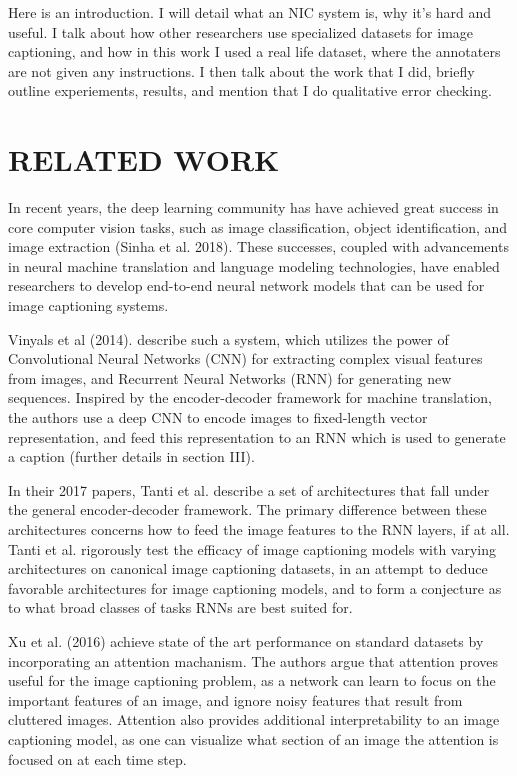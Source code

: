 \documentclass[letterpaper, 10 pt, conference]{ieeeconf}
\begin{document}
Here is an introduction. I will detail what an NIC system is, why it's hard and useful. I talk about how other researchers use specialized datasets for image captioning, and how in this work I used a real life dataset, where the annotaters are not given any instructions. I then talk about the work that I did, briefly outline experiements, results, and mention that I do qualitative error checking. 

\section{RELATED WORK}

In recent years, the deep learning community has have achieved great success in core computer vision tasks, such as image classification, object identification, and image extraction (Sinha et al. 2018). These successes, coupled with advancements in neural machine translation and language modeling technologies, have enabled researchers to develop end-to-end neural network models that can be used for image captioning systems. 

Vinyals et al (2014). describe such a system, which utilizes the power of Convolutional Neural Networks (CNN) for extracting complex visual features from images, and Recurrent Neural Networks (RNN) for generating new sequences. Inspired by the encoder-decoder framework for machine translation, the authors use a deep CNN to encode images to fixed-length vector representation, and feed this representation to an RNN which is used to generate a caption (further details in section III). 


In their 2017 papers, Tanti et al. describe a set of architectures that fall under the general encoder-decoder framework. The primary difference between these architectures concerns how to feed the image features to the RNN layers, if at all. Tanti et al. rigorously test the efficacy of image captioning models with varying architectures on canonical image captioning datasets, in an attempt to deduce favorable architectures for image captioning models, and to form a conjecture as to what broad classes of tasks RNNs are best suited for.

Xu et al. (2016) achieve state of the art performance on standard datasets by incorporating an attention machanism. The authors argue that attention proves useful for the image captioning problem, as a network can learn to focus on the important features of an image, and ignore noisy features that result from cluttered images. Attention also provides additional interpretability to an image captioning model, as one can visualize what section of an image the attention is focused on at each time step. 
\end{document}
